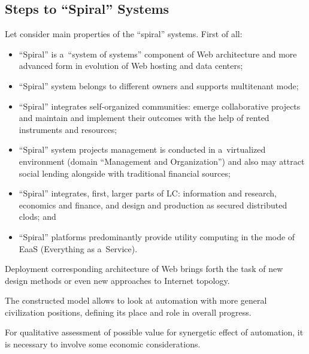 \begin{multicols}{2}
\section{Steps to ``Spiral'' Systems}

\noindent
 Let consider main properties of the ``spiral'' systems. First of all:
 \begin{itemize}
\item ``Spiral'' is a~``system of systems'' component of Web architecture and more advanced form in
evolution of Web hosting and data centers;\\[-14pt]
\item ``Spiral'' system belongs to different owners and supports multitenant mode;\\[-14pt]
\item ``Spiral'' integrates self-organized communities: emerge
collaborative projects and
maintain and implement their outcomes with the help of rented instruments and resources;\\[-14pt]
\item ``Spiral'' system projects management is conducted in a~virtualized environment (domain
``Management and Organization'') and also may attract social lending alongside with traditional financial
sources;\\[-14pt]
\item ``Spiral'' integrates, first, larger parts of LC: information
and research, economics and finance, and
design and production as secured distributed clods; and\\[-14pt]
\item ``Spiral'' platforms predominantly provide utility computing in the mode of EaaS (Everything as
a~Service).
 \end{itemize}

 Deployment corresponding architecture of Web  brings forth the task of new design methods or even new
approaches to Internet topology.

 The constructed model allows to look at automation with more general civilization positions, defining
its place and role in overall progress.

 For qualitative assessment of possible value for synergetic effect of automation, it
  is necessary to involve some economic considerations.

  \begin{figure*} %
\vspace*{1pt}
 \begin{center}
 \mbox{%
 \epsfxsize=162.416mm
 }
 \end{center}
 \vspace*{-11pt}
\vspace*{-3pt}
\end{figure*}


\end{multicols}
